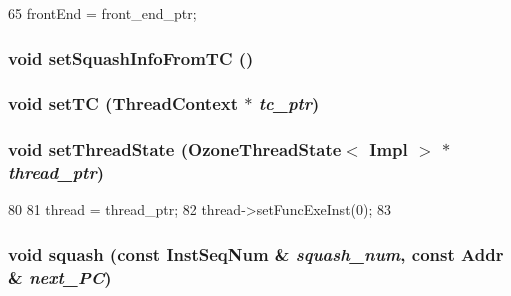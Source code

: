 \begin{DoxyCode}
65     { frontEnd = front_end_ptr; }
\end{DoxyCode}
\hypertarget{classInorderBackEnd_a9f7604c717497f0c9b7f416b3265e085}{
\subsubsection[{setSquashInfoFromTC}]{\setlength{\rightskip}{0pt plus 5cm}void setSquashInfoFromTC ()}}
\label{classInorderBackEnd_a9f7604c717497f0c9b7f416b3265e085}
\hypertarget{classInorderBackEnd_ac6ccaaea6ac518cab92f71723b5a739e}{
\subsubsection[{setTC}]{\setlength{\rightskip}{0pt plus 5cm}void setTC ({\bf ThreadContext} $\ast$ {\em tc\_\-ptr})}}
\label{classInorderBackEnd_ac6ccaaea6ac518cab92f71723b5a739e}
\hypertarget{classInorderBackEnd_a2a6551551e11d9e1947d6805e8322757}{
\subsubsection[{setThreadState}]{\setlength{\rightskip}{0pt plus 5cm}void setThreadState ({\bf OzoneThreadState}$<$ Impl $>$ $\ast$ {\em thread\_\-ptr})}}
\label{classInorderBackEnd_a2a6551551e11d9e1947d6805e8322757}



\begin{DoxyCode}
80 {
81     thread = thread_ptr;
82     thread->setFuncExeInst(0);
83 }
\end{DoxyCode}
\hypertarget{classInorderBackEnd_aa332542122e7959baf01e00f79e82bba}{
\subsubsection[{squash}]{\setlength{\rightskip}{0pt plus 5cm}void squash (const {\bf InstSeqNum} \& {\em squash\_\-num}, \/  const {\bf Addr} \& {\em next\_\-PC})}}
\label{classInorderBackEnd_aa332542122e7959baf01e00f79e82bba}



